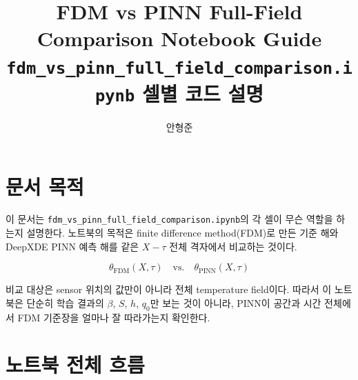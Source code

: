 \documentclass[11pt]{article}
\title{FDM vs PINN Full-Field Comparison Notebook Guide\\
\large \texttt{fdm\_vs\_pinn\_full\_field\_comparison.ipynb} 셀별 코드 설명}
\author{안형준}
\date{}
\begin{document}
\maketitle

\section{문서 목적}

이 문서는 \texttt{fdm\_vs\_pinn\_full\_field\_comparison.ipynb}의 각 셀이 무슨 역할을 하는지 설명한다.
노트북의 목적은 finite difference method(FDM)로 만든 기준 해와 DeepXDE PINN 예측 해를 같은 \(X-\tau\) 전체 격자에서 비교하는 것이다.

\[
\theta_{\mathrm{FDM}}(X,\tau)
\quad \text{vs.} \quad
\theta_{\mathrm{PINN}}(X,\tau)
\]

비교 대상은 sensor 위치의 값만이 아니라 전체 temperature field이다.
따라서 이 노트북은 단순히 학습 결과의 \(\beta\), \(S\), \(h\), \(q_0\)만 보는 것이 아니라, PINN이 공간과 시간 전체에서 FDM 기준장을 얼마나 잘 따라가는지 확인한다.

\section{노트북 전체 흐름}
\end{document}
